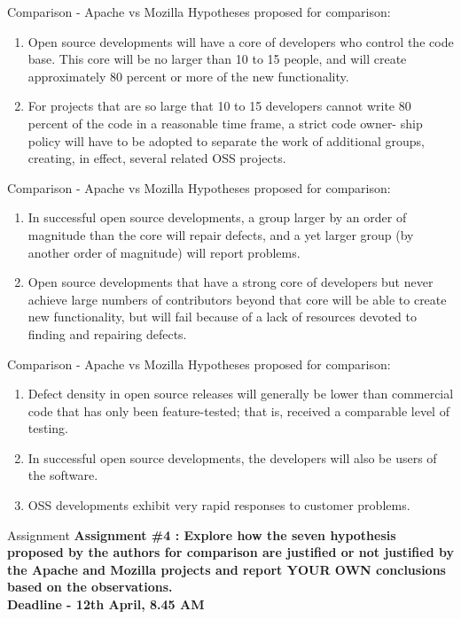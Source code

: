 \documentclass{beamer}
\begin{document}
\newcommand{\setiter}{\setcounter{hypothesiscounter}{\theenumi}}
\newcommand{\restoreiter}{\setcounter{enumi}{\thehypothesiscounter}}


\begin{frame}{Comparison - Apache vs Mozilla}
Hypotheses proposed for comparison:
\begin{enumerate}
	\item Open source developments will have a core of developers who control the code base. This core will be no larger than 10 to 15 people, and will create approximately 80 percent or more of the new functionality.
	\item For projects that are so large that 10 to 15 developers cannot
write 80 percent of the code in a reasonable time frame, a strict code owner-
ship policy will have to be adopted to separate the work of additional groups, creating, in effect, several related OSS projects. 
\end{enumerate}
\setiter
\end{frame}


\begin{frame}{Comparison - Apache vs Mozilla}
Hypotheses proposed for comparison:
\begin{enumerate}
	\restoreiter
	\item In successful open source developments, a group larger by an order of magnitude than the core will repair defects, and a yet larger group (by another order of magnitude) will report problems.
	\item Open source developments that have a strong core of developers but never achieve large numbers of contributors beyond that core will be able to create new functionality, but will fail because of a lack of resources devoted to finding and repairing defects.
	\setiter
\end{enumerate}
\end{frame}

\begin{frame}{Comparison - Apache vs Mozilla}
Hypotheses proposed for comparison:
\begin{enumerate}
	\restoreiter
	\item Defect density in open source releases will generally be lower than commercial code that has only been feature-tested; that is, received a comparable level of testing.
	\item In successful open source developments, the developers will
also be users of the software.
	\item  OSS developments exhibit very rapid responses to customer problems.
	\setiter
\end{enumerate}
\end{frame}

\begin{frame}{Assignment}
\textbf{Assignment \#4 : Explore how the seven hypothesis proposed by the authors for comparison are justified or not justified by the Apache and Mozilla projects and report YOUR OWN conclusions based on the observations.\\
Deadline - 12th April, 8.45 AM}
\end{frame}
\end{document}

